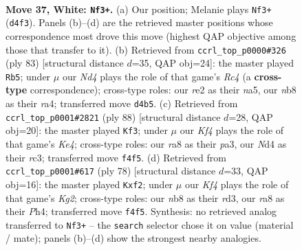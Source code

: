 \documentclass[11pt]{article}
\begin{document}
\clearpage

\begin{figure}[p]\centering
\begin{subfigure}{0.46\textwidth}\centering
\resizebox{\linewidth}{!}{%
\newchessgame
\chessboard[
  setfen={rn6/8/8/5p1p/3N1K1k/pP6/4r3/6R1 w - - 0 37},
  showmover=false,
  pgfstyle=straightmove, color=movearrow, markmove={d4-f3}
]}
\caption{}
\end{subfigure}\hfill
\begin{subfigure}{0.46\textwidth}\centering
\resizebox{\linewidth}{!}{%
\newchessgame
\chessboard[
  setfen={8/4n3/4k1pp/N1r1P3/R6P/1P6/6PK/8 b - - 0 42},
  showmover=false,
  pgfstyle=straightmove, color=movearrow, markmove={c5-b5}
]}
\caption{}
\end{subfigure}
\\[4pt]
\begin{subfigure}{0.46\textwidth}\centering
\resizebox{\linewidth}{!}{%
\newchessgame
\chessboard[
  setfen={3k4/R7/2p3p1/4p1P1/4K3/p1r1N3/8/8 w - - 3 45},
  showmover=false,
  pgfstyle=straightmove, color=movearrow, markmove={e4-f3}
]}
\caption{}
\end{subfigure}\hfill
\begin{subfigure}{0.46\textwidth}\centering
\resizebox{\linewidth}{!}{%
\newchessgame
\chessboard[
  setfen={7r/pR6/6pk/8/4R2P/3r4/P4pK1/8 w - - 0 40},
  showmover=false,
  pgfstyle=straightmove, color=movearrow, markmove={g2-f2}
]}
\caption{}
\end{subfigure}
\caption{\textbf{Move 37, White: \texttt{Nf3+}.} (a) Our position; Melanie plays \texttt{Nf3+} (\texttt{d4f3}). Panels (b)--(d) are the retrieved master positions whose correspondence most drove this move (highest QAP objective among those that transfer to it). (b) Retrieved from \texttt{ccrl\_top\_p0000\#326} (ply 83) [structural distance $d$=35, QAP obj=24]: the master played \texttt{Rb5}; under $\mu$ our \emph{Nd4} plays the role of that game's \emph{Rc4} (a \textbf{cross-type} correspondence); cross-type roles: our \emph{r}e2 as their \emph{n}a5, our \emph{n}b8 as their \emph{r}a4; transferred move \texttt{d4b5}. (c) Retrieved from \texttt{ccrl\_top\_p0001\#2821} (ply 88) [structural distance $d$=28, QAP obj=20]: the master played \texttt{Kf3}; under $\mu$ our \emph{Kf4} plays the role of that game's \emph{Ke4}; cross-type roles: our \emph{r}a8 as their \emph{p}a3, our \emph{N}d4 as their \emph{r}c3; transferred move \texttt{f4f5}. (d) Retrieved from \texttt{ccrl\_top\_p0001\#617} (ply 78) [structural distance $d$=33, QAP obj=16]: the master played \texttt{Kxf2}; under $\mu$ our \emph{Kf4} plays the role of that game's \emph{Kg2}; cross-type roles: our \emph{n}b8 as their \emph{r}d3, our \emph{r}a8 as their \emph{P}h4; transferred move \texttt{f4f5}. Synthesis: no retrieved analog transferred to \texttt{Nf3+} -- the \texttt{search} selector chose it on value (material / mate); panels (b)--(d) show the strongest nearby analogies.}
\label{fig:thought-m72}
\end{figure}
\end{document}
